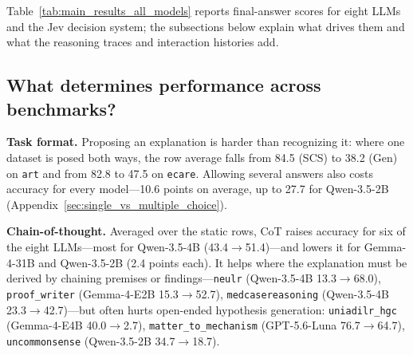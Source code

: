 

\label{sec:experiments}
\label{sec:results}

\graphicspath{{prism-uploads/}{figures/}{./}}

Table~\ref{tab:main_results_all_models} reports final-answer scores for eight LLMs and the Jev decision system; the subsections below explain what drives them and what the reasoning traces and interaction histories add.

\subsection{What determines performance across benchmarks?}
\label{sec:main_results}

\textbf{Task format.} Proposing an explanation is harder than recognizing it: where one dataset is posed both ways, the row average falls from 84.5 (SCS) to 38.2 (Gen) on \texttt{art} and from 82.8 to 47.5 on \texttt{ecare}. Allowing several answers also costs accuracy for every model---10.6 points on average, up to 27.7 for Qwen-3.5-2B (Appendix~\ref{sec:single_vs_multiple_choice}).

\textbf{Chain-of-thought.} Averaged over the static rows, CoT raises accuracy for six of the eight LLMs---most for Qwen-3.5-4B (43.4$\to$51.4)---and lowers it for Gemma-4-31B and Qwen-3.5-2B (2.4 points each). It helps where the explanation must be derived by chaining premises or findings---\texttt{neulr} (Qwen-3.5-4B 13.3$\to$68.0), \texttt{proof\_writer} (Gemma-4-E2B 15.3$\to$52.7), \texttt{medcasereasoning} (Qwen-3.5-4B 23.3$\to$42.7)---but often hurts open-ended hypothesis generation: \texttt{uniadilr\_hgc} (Gemma-4-E4B 40.0$\to$2.7), \texttt{matter\_to\_mechanism} (GPT-5.6-Luna 76.7$\to$64.7), \texttt{uncommonsense} (Qwen-3.5-2B 34.7$\to$18.7).

